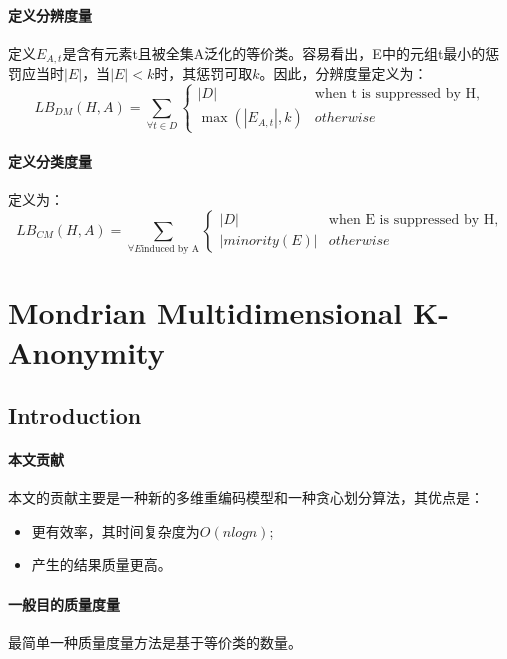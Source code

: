 \documentclass[12pt,a4paper]{article}
\begin{document}
\paragraph{定义分辨度量} 定义$E_{A,t}$是含有元素t且被全集A泛化的等价类。容易看出，E中的元组t最小的惩罚应当时$|E|$，当$|E| < k$时，其惩罚可取$k$。因此，分辨度量定义为：
\begin{equation}
	LB_{DM}(H,A) = \sum_{\forall t \in D} \left\{\begin{matrix}
						|D| & \mbox{when t is suppressed by H,}
						\\ 
						\max(|E_{A,t}|, k) & otherwise
						\end{matrix}\right.
\end{equation}

\paragraph{定义分类度量} 定义为：
\begin{equation}
	LB_{CM}(H,A) = \sum_{\forall E \mbox{induced by A} } \left\{\begin{matrix}
						|D| & \mbox{when E is suppressed by H,}
						\\ 
						|minority(E)| & otherwise
						\end{matrix}\right.
\end{equation}


\section{Mondrian Multidimensional K-Anonymity\cite{mondrian} }
\subsection{Introduction}
\paragraph{本文贡献} 本文的贡献主要是一种新的多维重编码模型和一种贪心划分算法，其优点是：
	\begin{itemize}
		\item 更有效率，其时间复杂度为$O(nlogn)$;
		\item 产生的结果质量更高。
	\end{itemize}
\paragraph{一般目的质量度量} 最简单一种质量度量方法是基于等价类的数量。
\end{document}
